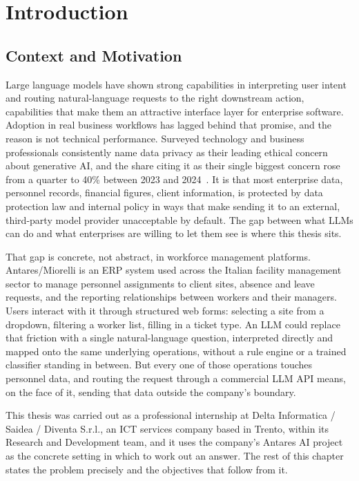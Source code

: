 \chapter{Introduction}
\label{ch:introduction}

\section{Context and Motivation}
\label{sec:intro_context}

Large language models have shown strong capabilities in interpreting user intent and routing natural-language requests to the right downstream action, capabilities that make them an attractive interface layer for enterprise software. Adoption in real business workflows has lagged behind that promise, and the reason is not technical performance. Surveyed technology and business professionals consistently name data privacy as their leading ethical concern about generative AI, and the share citing it as their single biggest concern rose from a quarter to 40\% between 2023 and 2024~\cite{deloitte2024ethics}. It is that most enterprise data, personnel records, financial figures, client information, is protected by data protection law and internal policy in ways that make sending it to an external, third-party model provider unacceptable by default. The gap between what LLMs can do and what enterprises are willing to let them see is where this thesis sits.

That gap is concrete, not abstract, in workforce management platforms. Antares/Miorelli is an ERP system used across the Italian facility management sector to manage personnel assignments to client sites, absence and leave requests, and the reporting relationships between workers and their managers. Users interact with it through structured web forms: selecting a site from a dropdown, filtering a worker list, filling in a ticket type. An LLM could replace that friction with a single natural-language question, interpreted directly and mapped onto the same underlying operations, without a rule engine or a trained classifier standing in between. But every one of those operations touches personnel data, and routing the request through a commercial LLM API means, on the face of it, sending that data outside the company's boundary.

This thesis was carried out as a professional internship at Delta Informatica / Saidea / Diventa S.r.l., an ICT services company based in Trento, within its Research and Development team, and it uses the company's Antares AI project as the concrete setting in which to work out an answer. The rest of this chapter states the problem precisely and the objectives that follow from it.

